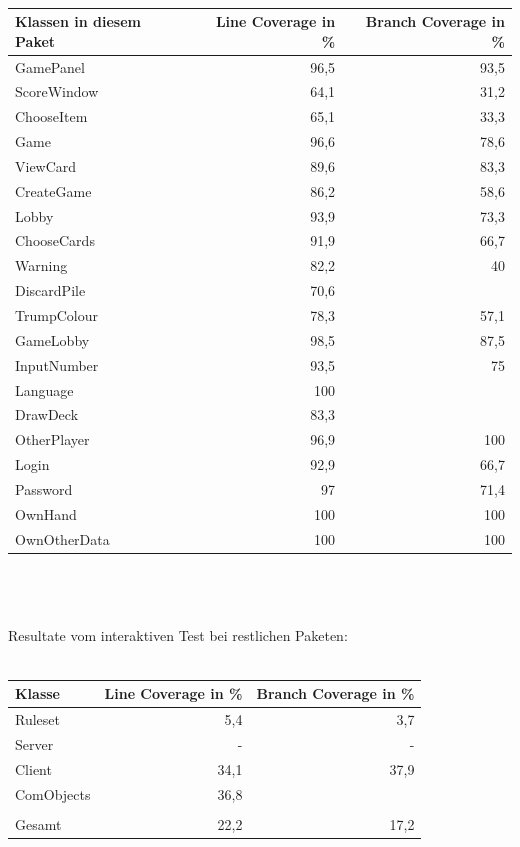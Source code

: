 \documentclass[a4paper]{article}
\begin{document}
\ \\
		
	\noindent
\begin{tabular}{|l|r|r|}
\hline
Klassen in diesem Paket & Line Coverage in \% & Branch Coverage in \% \\ \hline \hline
GamePanel & 96,5 & 93,5 \\ \hline
ScoreWindow & 64,1 & 31,2 \\ \hline
ChooseItem & 65,1 & 33,3 \\ \hline
Game & 96,6 & 78,6 \\ \hline
ViewCard & 89,6 & 83,3 \\ \hline
CreateGame & 86,2 & 58,6 \\ \hline
Lobby & 93,9 & 73,3 \\ \hline
ChooseCards & 91,9 & 66,7 \\ \hline
Warning & 82,2 & 40 \\ \hline
DiscardPile & 70,6 & \multicolumn{1}{l|}{} \\ \hline
TrumpColour & 78,3 & 57,1 \\ \hline
GameLobby & 98,5 & 87,5 \\ \hline
InputNumber & 93,5 & 75 \\ \hline
Language & 100 & \multicolumn{1}{l|}{} \\ \hline
DrawDeck & 83,3 & \multicolumn{1}{l|}{} \\ \hline
OtherPlayer & 96,9 & 100 \\ \hline
Login & 92,9 & 66,7 \\ \hline
Password & 97 & 71,4 \\ \hline
OwnHand & 100 & 100 \\ \hline
OwnOtherData & 100 & 100 \\ \hline
\end{tabular}
 \ \\ \ \\ \ \\
 	Resultate vom interaktiven Test bei restlichen Paketen: \\\\
 	\noindent
 	\begin{tabular}{|l|r|r|}\hline
 	Klasse & Line Coverage in \% & Branch Coverage in \% \\ \hline \hline
Ruleset & 5,4 & 3,7 \\ \hline
Server & - & - \\ \hline
Client & 34,1 & 37,9 \\ \hline
ComObjects & 36,8 &  \\ \hline
 &  &  \\ \hline
Gesamt & 22,2 & 17,2 \\ \hline
\end{tabular}
\end{document}
